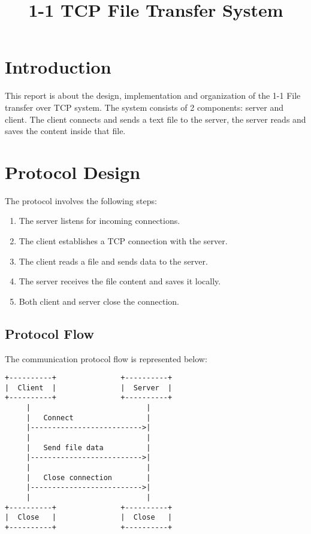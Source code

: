 \documentclass[a4paper,12pt]{article}
\title{\textbf{1-1 TCP File Transfer System}}
\author{}
\date{}
\begin{document}
\maketitle

\section*{Introduction}


This report is about the design, implementation and organization of the 1-1 File transfer over TCP system. The system consists of 2 components: server and client. The client connects and sends a text file to the server, the server reads and saves the content inside that file.

\section*{Protocol Design}
The protocol involves the following steps:
\begin{enumerate}

    \item The server listens for incoming connections.
    \item The client establishes a TCP connection with the server.
    \item The client reads a file and sends data to the server.
    \item The server receives the file content and saves it locally.
    \item Both client and server close the connection.
\end{enumerate}

\subsection*{Protocol Flow}
The communication protocol flow is represented below:
\begin{verbatim}
+----------+               +----------+
|  Client  |               |  Server  |
+----------+               +----------+
     |                           |
     |   Connect                 |
     |-------------------------->|
     |                           |
     |   Send file data          |
     |-------------------------->|
     |                           |
     |   Close connection        |
     |-------------------------->|
     |                           |
+----------+               +----------+
|  Close   |               |  Close   |
+----------+               +----------+
\end{verbatim}
\end{document}
